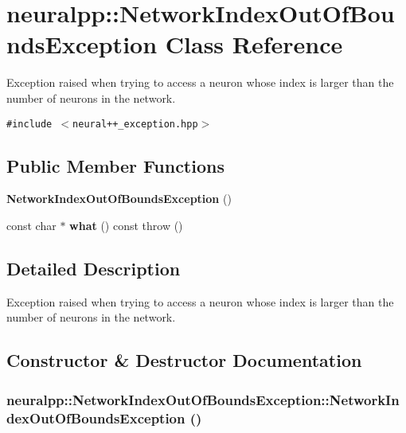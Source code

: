 \section{neuralpp::NetworkIndexOutOfBoundsException Class Reference}
\label{classneuralpp_1_1NetworkIndexOutOfBoundsException}
Exception raised when trying to access a neuron whose index is larger than the number of neurons in the network.  


{\tt \#include $<$neural++\_\-exception.hpp$>$}

\subsection*{Public Member Functions}
\begin{CompactItemize}
\item 
{\bf NetworkIndexOutOfBoundsException} ()
\item 
const char $\ast$ {\bf what} () const   throw ()
\end{CompactItemize}


\subsection{Detailed Description}
Exception raised when trying to access a neuron whose index is larger than the number of neurons in the network. 

\subsection{Constructor \& Destructor Documentation}
\subsubsection[NetworkIndexOutOfBoundsException]{\setlength{\rightskip}{0pt plus 5cm}neuralpp::NetworkIndexOutOfBoundsException::NetworkIndexOutOfBoundsException ()\hspace{0.3cm}{\tt  [inline]}}\label{classneuralpp_1_1NetworkIndexOutOfBoundsException_07141d2225ea9f2d486e755a3660d594}




